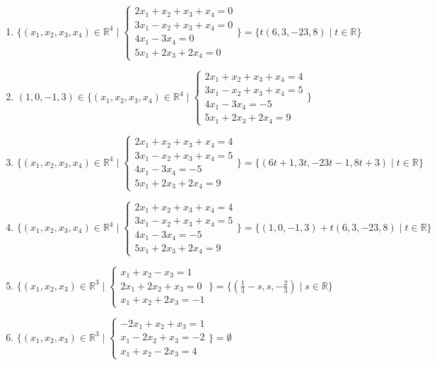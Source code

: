\documentclass[11pt,a4paper]{article}
\begin{document}
\begin{enumerate}
\item $\displaystyle \{(x_{1}, x_{2}, x_{3}, x_{4}) \in \mathbb{R}^{4} \mid \begin{cases} 2x_{1} + x_{2} + x_{3} + x_{4} = 0 \\ 3x_{1} - x_{2} + x_{3} + x_{4} = 0 \\ 4x_{1} - 3x_{4} = 0 \\ 5x_{1} + 2x_{3} + 2x_{4} = 0 \end{cases}\} = \{t (6, 3, -23, 8) \mid t \in \mathbb{R}\}$
\item $\displaystyle (1, 0, -1, 3) \in \{(x_{1}, x_{2}, x_{3}, x_{4}) \in \mathbb{R}^{4} \mid \begin{cases} 2x_{1} + x_{2} + x_{3} + x_{4} = 4 \\ 3x_{1} - x_{2} + x_{3} + x_{4} = 5 \\ 4x_{1} - 3x_{4} = -5 \\ 5x_{1} + 2x_{3} + 2x_{4} = 9 \end{cases}\}$
\item $\displaystyle \{(x_{1}, x_{2}, x_{3}, x_{4}) \in \mathbb{R}^{4} \mid \begin{cases} 2x_{1} + x_{2} + x_{3} + x_{4} = 4 \\ 3x_{1} - x_{2} + x_{3} + x_{4} = 5 \\ 4x_{1} - 3x_{4} = -5 \\ 5x_{1} + 2x_{3} + 2x_{4} = 9 \end{cases}\} = \{(6t + 1, 3t, -23t - 1, 8t + 3) \mid t \in \mathbb{R}\}$
\item $\displaystyle \{(x_{1}, x_{2}, x_{3}, x_{4}) \in \mathbb{R}^{4} \mid \begin{cases} 2x_{1} + x_{2} + x_{3} + x_{4} = 4 \\ 3x_{1} - x_{2} + x_{3} + x_{4} = 5 \\ 4x_{1} - 3x_{4} = -5 \\ 5x_{1} + 2x_{3} + 2x_{4} = 9 \end{cases}\} = \{(1, 0, -1, 3) + t (6, 3, -23, 8) \mid t \in \mathbb{R}\}$
\item $\displaystyle \{(x_{1}, x_{2}, x_{3}) \in \mathbb{R}^{3} \mid \begin{cases} x_{1} + x_{2} - x_{3} = 1 \\ 2x_{1} + 2x_{2} + x_{3} = 0 \\ x_{1} + x_{2} + 2x_{3} = -1 \end{cases}\} = \{(\frac{1}{3} - s, s, -\frac{2}{3}) \mid s \in \mathbb{R}\}$
\item $\displaystyle \{(x_{1}, x_{2}, x_{3}) \in \mathbb{R}^{3} \mid \begin{cases} -2x_{1} + x_{2} + x_{3} = 1 \\ x_{1} - 2x_{2} + x_{3} = -2 \\ x_{1} + x_{2} - 2x_{3} = 4 \end{cases}\} = \emptyset$

\end{enumerate}
\end{document}
